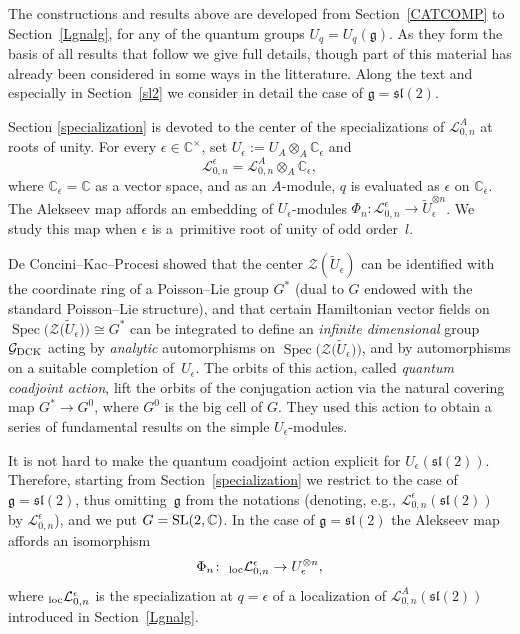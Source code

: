 \documentclass[pdftex]{sigma}%
\numberwithin{equation}{section}
\numberwithin{figure}{section}
\newcommand{\e}{\epsilon}
\newcommand{\mc}{\mathbb{C}}
\newcommand{\Gg}{{\mathcal G}}
\newcommand{\Ll}{{\mathcal L}}
\newcommand{\ra}{\rightarrow}
\begin{document}
The constructions and results above are developed from Section~\ref{CATCOMP} to Section~\ref{Lgnalg}, for any of the quantum groups $U_q = U_q(\mathfrak{g})$. As they form the basis of all results that follow we give full details, though part of this material has already been considered in some ways in the litterature. Along the text and especially in Section~\ref{sl2} we consider in detail the case of $\mathfrak{g}={\mathfrak{sl}}(2)$.

Section \ref{specialization} is devoted to the center of the specializations of $\Ll_{0,n}^A$ at roots of unity. For every $\e\in \mc^\times$, set $U_\e := U_A\otimes_A {\mathbb C}_{\e}$ and
\[\Ll_{0,n}^\e = \Ll_{0,n}^A\otimes_A {\mathbb C}_{\e},\]
where ${\mathbb C}_{\e}={\mathbb C}$ as a vector space, and as an $A$-module, $q$ is evaluated as $\e$ on ${\mathbb C}_{\e}$. The Alekseev map affords an embedding of $U_\e$-modules $\Phi_n\colon \Ll_{0,n}^\e\ra \tilde{U}_\e^{\otimes n}$. We study this map when $\e$ is a~primitive root of unity of odd order~$l$.

De Concini--Kac--Procesi \cite{DC-K,DC-K-P1,DC-K-P2} showed that the center $\mathcal{Z}(\tilde U_\e)$ can be identified with the coordinate ring of a Poisson--Lie group $G^*$ (dual to $G$ endowed with the standard Poisson--Lie structure), and that certain Hamiltonian vector fields on $\operatorname{Spec}\big(\mathcal{Z}\big(\tilde U_\e\big)\big)\cong G^*$ can be integrated to define an {\it infinite dimensional} group $\Gg_{\rm DCK}$ acting by {\it analytic} automorphisms on $\operatorname{Spec}\big(\mathcal{Z}\big(\tilde U_\e\big)\big)$, and by automorphisms on a suitable completion of~$U_\e$. The orbits of this action, called {\it quantum coadjoint action}, lift the orbits of the conjugation action via the natural covering map $G^*\ra G^0$, where $G^0$ is the big cell of $G$. They used this action to obtain a series of fundamental results on the simple $U_\e$-modules.

It is not hard to make the quantum coadjoint action explicit for $U_\e({\mathfrak{sl}}(2))$. Therefore, starting from Section~\ref{specialization} we restrict to the case of $\mathfrak{g}={\mathfrak{sl}}(2)$, thus omitting~$\mathfrak{g}$ from the notations (denoting, e.g., $\Ll_{0,n}^\e({\mathfrak{sl}}(2))$ by $\Ll_{0,n}^\e$), and we put $G={\rm SL}(2,\mc)$. In the case of $\mathfrak{g}={\mathfrak{sl}}(2)$ the Alekseev map affords an isomorphism
\[\Phi_n\colon \ {}_{\rm loc}\Ll_{0,n}^\e\ra U_\e^{\otimes n}, \]
where ${}_{\rm loc}\Ll_{0,n}^\e$ is the specialization at $q=\e$ of a localization of $\Ll_{0,n}^A({\mathfrak{sl}}(2))$ introduced in Section~\ref{Lgnalg}.
\end{document}
